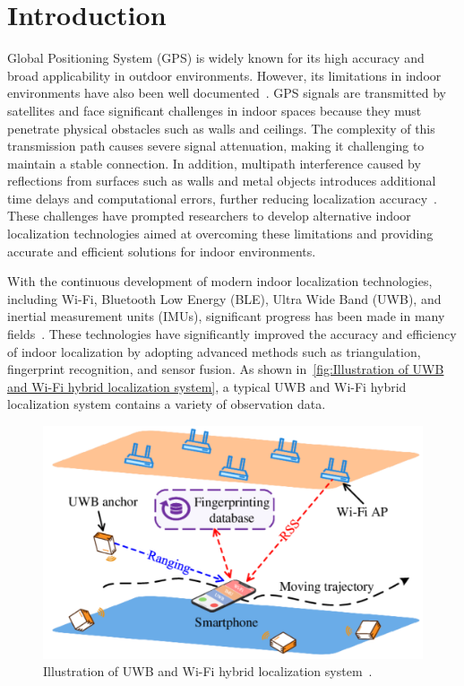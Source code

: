 \documentclass[12pt,a4paper]{article}
\numberwithin{equation}{section}
\begin{document}
\listoffigures
\newpage

\printnomenclature



\newpage

\section{Introduction}
Global Positioning System (GPS)  is
widely known for its high accuracy and broad applicability in outdoor
environments. However, its limitations in indoor environments have also been
well documented~\cite{wahab2022indoor}. GPS signals are transmitted by
satellites and face significant challenges in indoor spaces because they must
penetrate physical obstacles such as walls and ceilings. The complexity of this
transmission path causes severe signal attenuation, making it challenging to
maintain a stable connection. In addition, multipath interference caused by
reflections from surfaces such as walls and metal objects introduces additional
time delays and computational errors, further reducing localization
accuracy~\cite{wahab2022indoor}. These challenges have prompted researchers to
develop alternative indoor localization technologies aimed at overcoming these
limitations and providing accurate and efficient solutions for indoor
environments.

With the continuous development of modern indoor localization technologies,
including Wi-Fi, Bluetooth Low Energy (BLE), Ultra Wide Band (UWB), and inertial
measurement units (IMUs), significant progress has been made in many
fields~\cite{guo2019survey}. These technologies have significantly improved the
accuracy and efficiency of indoor localization by adopting advanced methods such
as triangulation, fingerprint recognition, and sensor fusion. As shown
in~\autoref{fig:Illustration of UWB and Wi-Fi hybrid localization system}, a
typical UWB and Wi-Fi hybrid localization system contains a variety of
observation data.

\begin{figure}[H]
  \centering
  \includegraphics[width=0.8\linewidth]{images/intro.png}
  \caption{Illustration of UWB and Wi-Fi hybrid localization
    system~\cite{article}.}
  \label{fig:Illustration of UWB and Wi-Fi hybrid localization system}
\end{figure}
\end{document}
